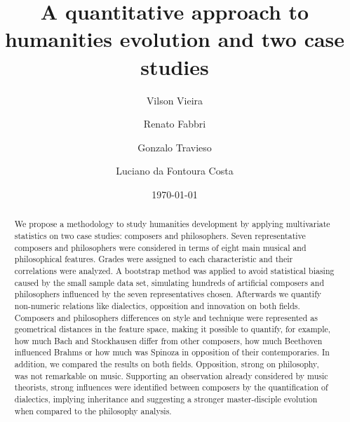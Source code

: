 \documentclass[
 aip,
 jmp,
 amsmath,amssymb,
 reprint,
]{revtex4-1}
\begin{document}
\title[A quantitative approach to humanities evolution and two case studies]{A quantitative approach to humanities evolution and two case studies}
\author{Vilson Vieira}
\author{Renato Fabbri}
\author{Gonzalo Travieso}
\author{Luciano da Fontoura Costa}
\date{\today}
\begin{abstract}
We propose a
methodology
to study humanities development by
applying multivariate statistics on two case studies: composers and philosophers.
Seven representative composers and philosophers were considered in terms of
eight main musical and philosophical features. 
Grades
were assigned to each characteristic and their correlations were
analyzed. 
A bootstrap method was
applied to avoid statistical biasing caused by the small sample data set, simulating hundreds of artificial composers and philosophers
influenced by the seven representatives chosen.
Afterwards we quantify non-numeric relations like dialectics, opposition
and innovation on both fields.
Composers and philosophers differences on style and technique were represented
as geometrical distances in the feature space, making it possible to
quantify, for example, how much Bach and Stockhausen differ from other composers, how
much Beethoven influenced Brahms or how much was Spinoza in opposition of their contemporaries.
In addition, we compared the results on both fields. Opposition, strong on
philosophy, was not remarkable on music. Supporting an observation already considered by music
theorists, strong influences were identified between
composers by the quantification of dialectics, implying inheritance and suggesting a stronger
master-disciple evolution when compared to the philosophy analysis.
\end{abstract}
\maketitle
\end{document}
